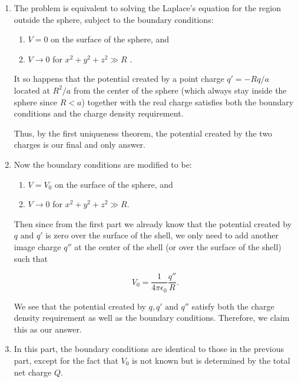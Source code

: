 \documentclass[english,a4paper,12pt]{report}
\begin{document}
{\begin{enumerate}
    \item The problem is equivalent to solving the Laplace's equation for the region outside the sphere, subject to the boundary conditions: 
    
    \begin{enumerate}[itemsep=10pt] 
        \item \(V = 0\) on the surface of the sphere, and
        \item \(V \rightarrow 0\) for  \(x^2 + y^2 + z^2 \gg R\) .		
    \end{enumerate} 
    
    It so happens that the potential created by a point charge \(q' = -Rq /a\) located at \(R^2 /a \) from the center of the sphere (which always stay inside the sphere since \(R < a\)) together with the real charge satisfies both the boundary conditions and the charge density requirement. 
    
    Thus, by the first uniqueness theorem, the potential created by the two charges is our final and only answer.\newline 
    
    \item Now the boundary conditions are modified to be:
    
    \begin{enumerate}
        \item \(V = V_0\) on the surface of the sphere, and
        \item \(V \rightarrow 0\) for \(x^2 + y^2 + z^2 \gg R\).	 
    \end{enumerate}
    
    Then since from the first part we already know that the potential created by \(q \text{ and } q'\) is zero over the surface of the shell, we only need to add another image charge \(q''\) at the center of the shell (or over the surface of the shell) such that 
    
    \begin{equation}
        V_0 = \frac{1}{4\pi\epsilon_0} \frac{q''}{R}.
    \end{equation}
    
    We see that the potential created by \(q, q' \text{ and } q''\) satisfy both the charge density requirement as well as the boundary conditions. Therefore, we claim this as our answer. \newline
    
    \item In this part, the boundary conditions are identical to those in the previous part, except for the fact that \(V_0\) is not known but is determined by the total net charge \(Q\). 
    

\end{enumerate}}
\end{document}
